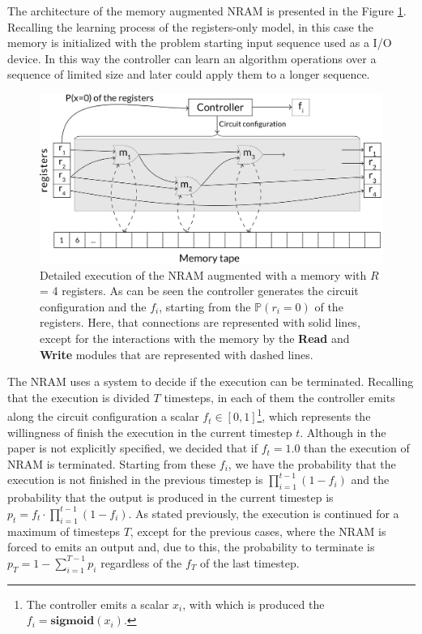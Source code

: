 The architecture of the memory augmented NRAM is presented in the Figure \ref{fig:memory-nram}. Recalling the learning process of the registers-only model, in this case the memory is initialized with the problem starting input sequence used as a I/O device. In this way the controller can learn an algorithm operations over a sequence of limited size and later could apply them to a longer sequence.\newline\newline
\begin{figure}[t!]
	\centering
	\includegraphics[width=\textwidth]{figures/memory-augmented-model.png}
	\caption{Detailed execution of the NRAM augmented with a memory with $R$ = 4 registers. As can be seen the controller generates the circuit configuration and the $f_i$, starting from the $\mathbb{P}(r_i = 0)$ of the registers. Here, that connections are represented with solid lines, except for the interactions with the memory by the \textbf{Read} and \textbf{Write} modules that are represented with dashed lines.}
	\label{fig:memory-nram}
\end{figure}
The NRAM uses a system to decide if the execution can be terminated. Recalling that the execution is divided $T$ timesteps, in each of them the controller emits along the circuit configuration a scalar $f_{t} \in [0, 1]$\footnote{The controller emits a scalar $x_{i}$, with which is produced the $f_i = \textbf{sigmoid}(x_{i})$.}, which represents the willingness of finish the execution in the current timestep $t$. Although in the paper is not explicitly specified, we decided that if $f_{t} = 1.0$ than the execution of NRAM is terminated. Starting from these $f_i$, we have the probability that the execution is not finished in the previous timestep is $\prod\limits_{i=1}^{t-1}(1 - f_{i})$ and the probability that the output is produced in the current timestep is $p_{t} = f_{t} \cdot \prod\limits_{i=1}^{t-1}(1 - f_{i})$. As stated previously, the execution is continued for a maximum of timesteps $T$, except for the previous cases, where the NRAM is forced to emits an output and, due to this, the probability to terminate is $p_{T} = 1 - \sum\limits_{i=1}^{T-1}p_{i}$ regardless of the $f_{T}$ of the last timestep. 

